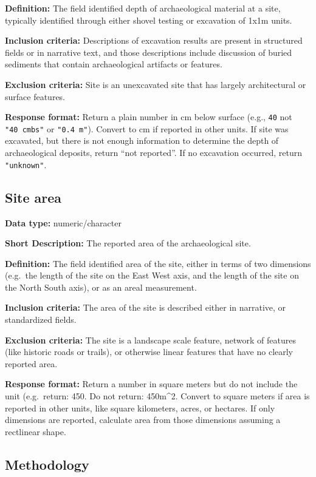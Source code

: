 \documentclass[
]{article}
\begin{document}
\textbf{Definition:} The field identified depth of archaeological
material at a site, typically identified through either shovel testing
or excavation of 1x1m units.

\textbf{Inclusion criteria:} Descriptions of excavation results are
present in structured fields or in narrative text, and those
descriptions include discussion of buried sediments that contain
archaeological artifacts or features.

\textbf{Exclusion criteria:} Site is an unexcavated site that has
largely architectural or surface features.

\textbf{Response format:} Return a plain number in cm below surface
(e.g., \texttt{40} not \texttt{"40\ cmbs"} or \texttt{"0.4\ m"}).
Convert to cm if reported in other units. If site was excavated, but
there is not enough information to determine the depth of archaeological
deposits, return ``not reported''. If no excavation occurred, return
\texttt{"unknown"}.

\subsection{Site area}\label{site-area}

\textbf{Data type:} numeric/character

\textbf{Short Description:} The reported area of the archaeological
site.

\textbf{Definition:} The field identified area of the site, either in
terms of two dimensions (e.g.~the length of the site on the East West
axis, and the length of the site on the North South axis), or as an
areal measurement.

\textbf{Inclusion criteria:} The area of the site is described either in
narrative, or standardized fields.

\textbf{Exclusion criteria:} The site is a landscape scale feature,
network of features (like historic roads or trails), or otherwise linear
features that have no clearly reported area.

\textbf{Response format:} Return a number in square meters but do not
include the unit (e.g.~return: 450. Do not return: 450m\^{}2. Convert to
square meters if area is reported in other units, like square
kilometers, acres, or hectares. If only dimensions are reported,
calculate area from those dimensions assuming a rectlinear shape.

\subsection{Methodology}\label{methodology}
\end{document}

